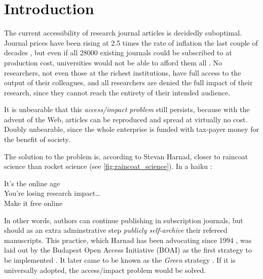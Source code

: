 \documentclass[11pt, openany, oneside, article, a4paper, twocolumn]{memoir}
\begin{document}
\saythanks

\section{Introduction}

The current accessibility of research journal articles is decidedly
suboptimal. Journal prices have been rising at 2.5 times the rate of
inflation the last couple of decades \cite{monograph_serial_costs,
suber2008open}, but even if all 28000 existing journals could be
subscribed to at production cost, universities would not be able to afford
them all \cite{harnad2008access}. No researchers, not even those at the
richest institutions, have full access to the output of their colleagues,
and all researchers are denied the full impact of their research, since
they cannot reach the entirety of their intended audience.

It is unbearable that this \emph{access/impact problem} still persists,
because with the advent of the Web, articles can be reproduced and spread
at virtually no cost. Doubly unbearable, since the whole enterprise is
funded with tax-payer money for the benefit of society. 

The solution to the problem is, according to Stevan Harnad, closer to
raincoat science than rocket science (see \autoref{fig:raincoat_science}). In a haiku \cite{harnad_raincoat}:

\pagebreak

\begin{displayquote}
\begin{small}
It's the online age\\
You're losing research impact\dots \\
Make it free online
\end{small}
\end{displayquote}
In other words, authors can continue publishing in subscription journals,
but should as an extra adminstrative step \emph{publicly self-archive}
their refereed manuscripts. This practice, which Harnad has been
advocating since 1994 \cite{harnad1995subversive}, was laid out by the
Budapest Open Access Initiative (BOAI) as the first strategy to be
implemented \cite{boai}. It later came to be known as the \emph{Green}
strategy \cite{harnad2004access}. If it is universally adopted, the
access/impact problem would be solved.
\end{document}
